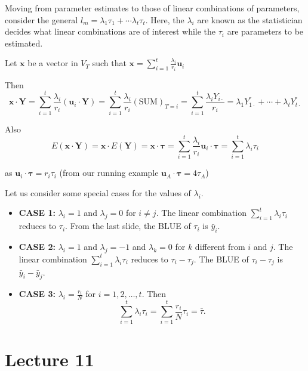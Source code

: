 \documentclass{tufte-book}
\newcommand{\E}{\mathbb{E}}
\begin{document}
Moving from parameter estimates to those of linear combinations of parameters, consider the general 
$l_{m} = \lambda_{1} \tau_{1} + \cdots \lambda_{t} \tau_{t}$. Here, the $\lambda_{i}$ are known as the statistician decides what
linear combinations are of interest while the $\tau_{i}$ are parameters to be estimated. 


Let $\mathbf{x}$ be a vector in $V_T$ such that $\mathbf{x} = \sum_{i=1}^t \frac{\lambda_i}{r_i} \mathbf{u}_i$

Then
\[
\mathbf{x} \cdot \mathbf{Y} = \sum_{i=1}^t \frac{\lambda_i}{r_i} (\mathbf{u}_i \cdot \mathbf{Y})
= \sum_{i=1}^t \frac{\lambda_i}{r_i} (\text{SUM})_{T=i} = \sum_{i=1}^t \frac{\lambda_i Y_{i \cdot}}{r_i}
= \lambda_1 \bar{Y_{1 \cdot}} + \cdots + \lambda_t \bar{Y_{t \cdot}}
\]

Also 
\marginnote{As a reminder, $\E(Y) = \tau$.}
\[
E(\mathbf{x} \cdot \mathbf{Y}) = \mathbf{x} \cdot E(\mathbf{Y})
= \mathbf{x} \cdot \boldsymbol{\tau} = \sum_{i=1}^t \frac{\lambda_i}{r_i} \mathbf{u}_i \cdot \boldsymbol{\tau} = \sum_{i=1}^t \lambda_i \tau_i
\]

as $\mathbf{u}_i \cdot \boldsymbol{\tau} = r_i \tau_i$ (from our running example $\mathbf{u}_A \cdot \boldsymbol{\tau} = 
4\tau_A$)


Let us consider some special cases for the values of $\lambda_i$.

\begin{itemize}
    \item \textbf{CASE 1:} $\lambda_i = 1$ and $\lambda_j = 0$ for $i \neq j$. The linear combination $\sum_{i=1}^{t} \lambda_i 
    \tau_i$ reduces to $\tau_i$. From the last slide, the BLUE of $\tau_i$ is $\bar{y}_i$.
    
    \item \textbf{CASE 2:} $\lambda_i = 1$ and $\lambda_j = -1$ and $\lambda_k = 0$ for $k$ different from $i$ and $j$. The 
    linear combination $\sum_{i=1}^{t} \lambda_i \tau_i$ reduces to $\tau_i - \tau_j$. The BLUE of $\tau_i - \tau_j$ is 
    $\bar{y}_i - \bar{y}_j$.
    
    \item \textbf{CASE 3:} $\lambda_i = \frac{r_i}{N}$ for $i = 1,2,\dots,t$. Then 
    \[
    \sum_{i=1}^{t} \lambda_i \tau_i = \sum_{i=1}^{t} \frac{r_i}{N} \tau_i = \bar{\tau}.
    \]
\end{itemize}

\section{Lecture 11}
\end{document}
